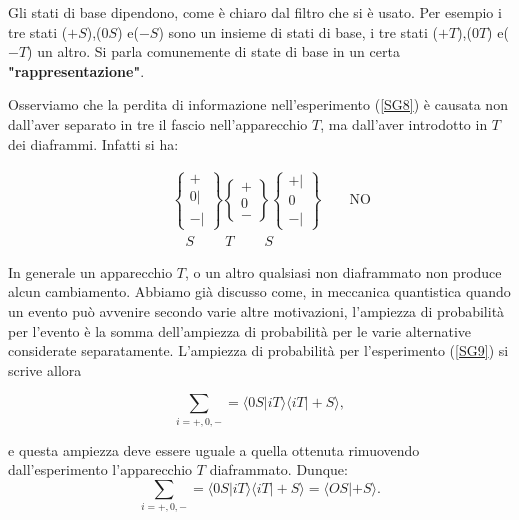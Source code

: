 \documentclass[a4paper,12pt,oneside]{book}
\begin{document}
Gli stati di base dipendono, come è chiaro dal filtro che si è usato. Per esempio i tre stati ($+S$),($0S$) e($-S$) sono un insieme di stati di base, i tre stati ($+T$),($0T$) e($-T$) un altro. Si parla comunemente di state di base in un certa \textbf{"rappresentazione"}.

Osserviamo che la perdita di informazione nell'esperimento (\ref{SG8}) è causata non dall'aver separato in tre il fascio nell'apparecchio $T$, ma dall'aver introdotto in $T$ dei diaframmi. Infatti si ha:

\begin{eqnarray}
& &\begin{Bmatrix}
 + \\ 0 | \\ - |  
\end{Bmatrix}
\begin{Bmatrix}
 +  \\ 0  \\ -   
\end{Bmatrix}
\begin{Bmatrix}
 + | \\ 0  \\ - |  
\end{Bmatrix} \qquad \text{NO} \\
& & \quad S  \ \qquad T\ \qquad S \nonumber
\label{SG9}
\end{eqnarray}

In generale un apparecchio $T$, o un altro qualsiasi non diaframmato non produce alcun cambiamento. Abbiamo già discusso come, in meccanica quantistica quando un evento può avvenire secondo varie altre motivazioni, l'ampiezza di probabilità per l'evento è la somma dell'ampiezza di probabilità per le varie alternative considerate separatamente. L'ampiezza di probabilità per l'esperimento (\ref{SG9}) si scrive allora

\begin{equation}
\sum\limits_{i=+,0,-}=\langle 0S | iT \rangle \langle iT | +S \rangle ,
\end{equation}

e questa ampiezza deve essere uguale a quella ottenuta rimuovendo  dall'esperimento l'apparecchio $T$ diaframmato. Dunque:
\begin{equation}
\sum\limits_{i=+,0,-}=\langle 0S | iT \rangle \langle iT | +S \rangle = \langle OS | +S \rangle .
 \label{cap3_2}
\end{equation}
\end{document}
